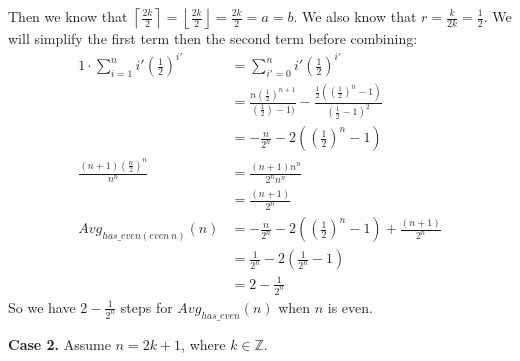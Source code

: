 \documentclass{article}
\begin{document}
\begin{enumerate}
\begin{enumerate}[label=(\alph*)]
            Then we know that $\left\lceil \frac{2k}{2} \right\rceil = 
            \left\lfloor \frac{2k}{2} \right\rfloor= \frac{2k}{2} = a = b$. We also 
            know that $r = \frac{k}{2k} = \frac{1}{2}$. 
            We will simplify the first term then the second term before combining:
            \begin{align*}
             1 \cdot \sum_{i=1}^{n} i' \left( \frac{1}{2}\right)^ {i'} &= 
                \sum_{i'=0}^{n} i'\left( \frac{1}{2} \right)^{i'} \tag*{(Term at $i=0$ is 0)} \\
                   &= \frac{n (\frac{1}{2})^ {n+1}}{ (\frac{1}{2})-1)} - 
                       \frac{\frac{1}{2} ( (\frac{1}{2})^n - 1)}{ 
                       (\frac{1}{2} - 1)^2} \tag*{(Closed-form)}\\
                   &= - \frac{n}{2^{n}} - 2 \left( \left(\frac{1}{2} \right)^n - 1
                       \right)\\
                    \frac{ (n+1) (\frac{n}{2})^n}{n^n} &= \frac{ (n+1) n^n}{ 2^n n^n } \\
                                                       &= \frac{ (n+1)}{2^n} \\
                    Avg_ {has\_even (even \: n)} (n)&= 
                - \frac{n}{2^n} - 2 \left( \left( \frac{1}{2} \right)^n - 1 \right) 
                    + \frac{ (n+1)}{2^n} \\ &= \frac{1}{2^n} - 2(\frac{1}{2^n} - 1)  \\
                                            &= 2 - \frac{1}{2^n}
            \end{align*}
            So we have $2 - \frac{1}{2^n}$ steps for 
            $Avg_ {has\_even} (n)$ when $n$ is even.

            \textbf{Case 2.} Assume $n = 2k + 1$, where $k \in \mathbb{Z}$.
            

\end{enumerate}
\end{enumerate}
\end{document}
